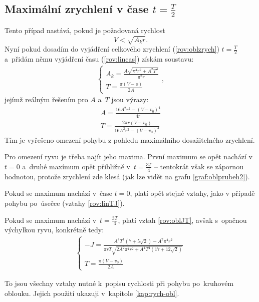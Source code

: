 		\subsection{Maximální zrychlení v čase $t=\frac{T}{2}$}\label{kap:maxT2}
		
		Tento případ nastává, pokud je požadovaná rychlost
		\begin{equation}
			V<\sqrt{A_k r}.
		\end{equation}
		Nyní pokud dosadím do vyjádření celkového zrychlení (\ref{rov:oblzrych}) $t=\frac{T}{2}$ a~přidám němu vyjádření času (\ref{rov:lincas}) získám soustavu:
		\begin{eqnarray}\label{rov:oblak}
			\begin{cases}
			A_k = \frac{A\sqrt{\pi^4r^2+A^2T^4}}{\pi^2r} \\
			T = \frac{\pi \left(V-o\right)}{2A}
			\end{cases},
		\end{eqnarray}
		jejímž reálným řešením pro $A$ a~$T$ jsou výrazy:
		\begin{eqnarray}\label{rov:oblt2a}
			A = \frac{16A^2r^2-\left(V-v_0\right)^4}{4r} \nonumber \\
			T = \frac{2\pi r \left(V-v_0\right)}{16A^2r^2-\left(V-v_0\right)^4}
		\end{eqnarray}
		Tím je vyřešeno omezení pohybu z pohledu maximálního dosažitelného zrychlení.
		
		Pro omezení ryvu je třeba najít jeho maxima. První maximum se opět nachází v~$t=0$ a~druhé maxímum opět přibližně v~$t=\frac{3T}{4}$ -- tentokrát však se zápornou hodnotou, protože zrychlení zde klesá (jak lze vidět na grafu \ref{graf:oblprubeh2}).
		
		Pokud se maximum nachází v~čase $t=0$, platí opět stejné vztahy, jako v případě pohybu po~úsečce (vztahy \ref{rov:linTJ}).
		
		Pokud se maximum nachází v~$t=\frac{3T}{4}$, platí vztah \ref{rov:oblJT}, avšak s~opačnou výchylkou ryvu, konkrétně tedy:
		\begin{eqnarray}
			\label{rov:oblJT2}
			\begin{cases}
			-J=\frac{A^4T^4\left(7+5\sqrt{2}\right)-A^2\pi^4r^2}{\pi rT\sqrt{2A^2\pi^4r^2+A^4T^4\left(17+12\sqrt{2}\right)}} \nonumber \\
			T=\frac{\pi(V-v_0)}{2A}
			\end{cases}
		\end{eqnarray}
		
		To jsou všechny vztahy nutné k~popisu rychlosti při pohybu po~kruhovém oblouku. Jejich použití ukazuji v~kapitole \ref{kap:rych-obl}.
		
